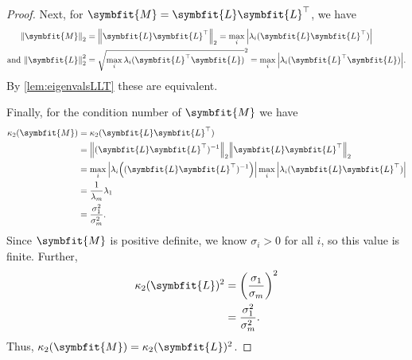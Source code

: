 \documentclass{article}
\theoremstyle{definition}
\newcommand{\mat}[1]{\symbfit{#1}}
\begin{document}
\begin{enumerate}[leftmargin=\labelsep]
\begin{proof}
		      Next, for \(\mat{M} = \mat{L}\mat{L}^\top\), we have
		      \begin{align*}
			      \norm{\mat{M}}_2              & = \norm{\mat{L}\mat{L}^\top}_2 = \max_i \abs{ \lambda_i(\mat{L}\mat{L}^\top) }                   \\
			      \text{and }\norm{\mat{L}}_2^2 & = \sqrt{\max_i\lambda_i(\mat{L}^\top\mat{L})}^2 = \max_i \abs{ \lambda_i(\mat{L}^\top\mat{L}) }.
		      \end{align*}
		      By \cref{lem:eigenvalsLLT} these are equivalent.

		      Finally, for the condition number of \(\mat{M}\) we have
		      \begin{align*}
			      \kappa_2(\mat{M}) & = \kappa_2(\mat{L}\mat{L}^\top)                                                                          \\
			                        & = \norm{(\mat{L}\mat{L}^\top)^{-1}}_2 \norm{\mat{L}\mat{L}^\top}_2                                       \\
			                        & = \max_i \abs{ \lambda_i\qty((\mat{L}\mat{L}^\top)^{-1} )} \max_i \abs{ \lambda_i(\mat{L}\mat{L}^\top) } \\
			                        & = \frac{1}{\lambda_m} \lambda_1                                                                          \\
			                        & = \frac{\sigma_1^2}{\sigma_m^2}.
		      \end{align*}
		      Since \(\mat{M}\) is positive definite, we know \(\sigma_i>0\) for all \(i\), so this value is finite. Further,
		      \begin{align*}
			      \kappa_2(\mat{L})^2 & = \qty(\frac{\sigma_1}{\sigma_m})^2 \\
			                          & = \frac{\sigma_1^2}{\sigma_m^2}.
		      \end{align*}
		      Thus, \(\kappa_2(\mat{M}) = \kappa_2(\mat{L})^2\).
	      \end{proof}


\end{enumerate}
\end{document}
